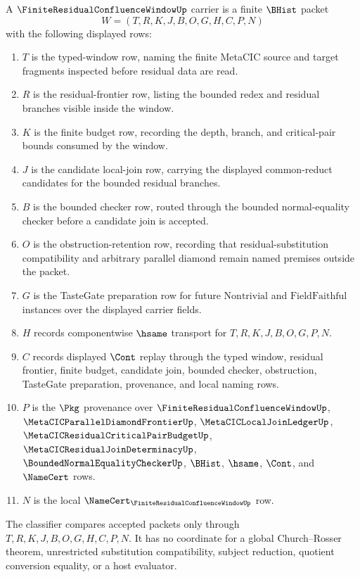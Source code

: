 \begin{definition}
\label{def:finite-residual-confluence-window-carrier}
A $\FiniteResidualConfluenceWindowUp$ carrier is a finite $\BHist$ packet
$$
W=(T,R,K,J,B,O,G,H,C,P,N)
$$
with the following displayed rows:
\begin{enumerate}
\item $T$ is the typed-window row, naming the finite MetaCIC source and target fragments inspected before residual data are read.
\item $R$ is the residual-frontier row, listing the bounded redex and residual branches visible inside the window.
\item $K$ is the finite budget row, recording the depth, branch, and critical-pair bounds consumed by the window.
\item $J$ is the candidate local-join row, carrying the displayed common-reduct candidates for the bounded residual branches.
\item $B$ is the bounded checker row, routed through the bounded normal-equality checker before a candidate join is accepted.
\item $O$ is the obstruction-retention row, recording that residual-substitution compatibility and arbitrary parallel diamond remain named premises outside the packet.
\item $G$ is the TasteGate preparation row for future $\mathrm{Nontrivial}$ and $\mathrm{FieldFaithful}$ instances over the displayed carrier fields.
\item $H$ records componentwise $\hsame$ transport for $T,R,K,J,B,O,G,P,N$.
\item $C$ records displayed $\Cont$ replay through the typed window, residual frontier, finite budget, candidate join, bounded checker, obstruction, TasteGate preparation, provenance, and local naming rows.
\item $P$ is the $\Pkg$ provenance over $\FiniteResidualConfluenceWindowUp$, $\MetaCICParallelDiamondFrontierUp$, $\MetaCICLocalJoinLedgerUp$, $\MetaCICResidualCriticalPairBudgetUp$, $\MetaCICResidualJoinDeterminacyUp$, $\BoundedNormalEqualityCheckerUp$, $\BHist$, $\hsame$, $\Cont$, and $\NameCert$ rows.
\item $N$ is the local $\NameCert_{\FiniteResidualConfluenceWindowUp}$ row.
\end{enumerate}
The classifier compares accepted packets only through $T,R,K,J,B,O,G,H,C,P,N$. It has no coordinate for a global Church--Rosser theorem, unrestricted substitution compatibility, subject reduction, quotient conversion equality, or a host evaluator.
\end{definition}

